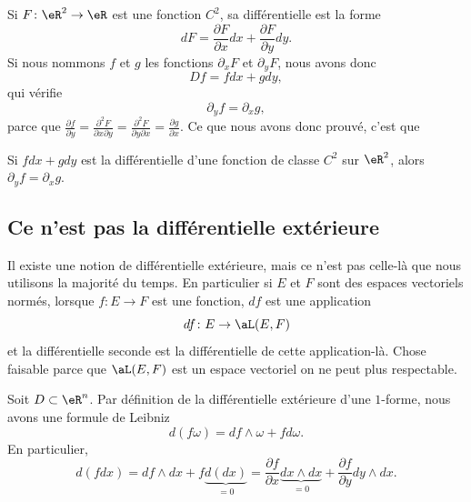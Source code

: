 \begin{example}
	Si \( F\colon \eR^2\to \eR\) est une fonction \( C^2\), sa différentielle est la forme
	\begin{equation}
		dF=\frac{ \partial F }{ \partial x }dx+\frac{ \partial F }{ \partial y }dy.
	\end{equation}
	Si nous nommons \( f\) et \( g\) les fonctions \( \partial_xF\) et \( \partial_yF\), nous avons donc
	\begin{equation}
		Df=fdx+gdy,
	\end{equation}
	qui vérifie
	\begin{equation}
		\partial_yf=\partial_xg,
	\end{equation}
	parce que \( \frac{ \partial f }{ \partial y }=\frac{ \partial^2F  }{ \partial x\partial y }=\frac{ \partial^2F  }{ \partial y\partial x }=\frac{ \partial g }{ \partial x }\). Ce que nous avons donc prouvé, c'est que
\end{example}

\begin{lemma}
	Si \( fdx+gdy\) est la différentielle d'une fonction de classe \( C^2\) sur \( \eR^2\), alors \( \partial_yf=\partial_xg\).
\end{lemma}

\subsection{Ce n'est pas la différentielle extérieure}

Il existe une notion de différentielle extérieure, mais ce n'est pas celle-là que nous utilisons la majorité du temps. En particulier si \( E\) et \( F\) sont des espaces vectoriels normés, lorsque \( f\colon E\to F\) est une fonction, \( df\) est une application
\begin{equation}
	df\colon E\to \aL(E,F)
\end{equation}
et la différentielle seconde est la différentielle de cette application-là. Chose faisable parce que \( \aL(E,F)\) est un espace vectoriel on ne peut plus respectable.

Soit \( D\subset\eR^n\). Par définition de la différentielle extérieure d'une \( 1\)-forme, nous avons une formule de Leibniz
\begin{equation}
	d(f\omega)=df\wedge\omega+fd\omega.
\end{equation}
En particulier,
\begin{equation}
	d(fdx)=df\wedge dx+f\underbrace{d(dx)}_{=0}=\frac{ \partial f }{ \partial x }\underbrace{dx\wedge dx}_{=0}+\frac{ \partial f }{ \partial y }dy\wedge dx.
\end{equation}


